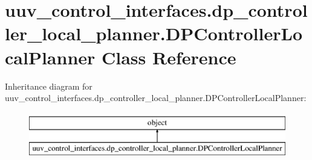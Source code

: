 \hypertarget{classuuv__control__interfaces_1_1dp__controller__local__planner_1_1DPControllerLocalPlanner}{}\section{uuv\+\_\+control\+\_\+interfaces.\+dp\+\_\+controller\+\_\+local\+\_\+planner.\+D\+P\+Controller\+Local\+Planner Class Reference}
\label{classuuv__control__interfaces_1_1dp__controller__local__planner_1_1DPControllerLocalPlanner}
Inheritance diagram for uuv\+\_\+control\+\_\+interfaces.\+dp\+\_\+controller\+\_\+local\+\_\+planner.\+D\+P\+Controller\+Local\+Planner\+:\begin{figure}[H]
\begin{center}
\leavevmode
\includegraphics[height=2.000000cm]{classuuv__control__interfaces_1_1dp__controller__local__planner_1_1DPControllerLocalPlanner}
\end{center}
\end{figure}
